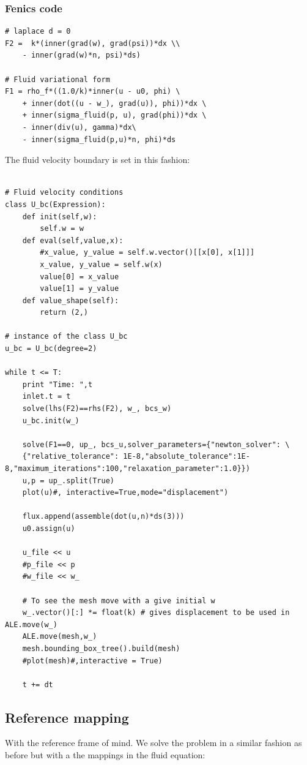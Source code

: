 \subsubsection{Fenics code}
\begin{lstlisting}[frame=single]
# laplace d = 0
F2 =  k*(inner(grad(w), grad(psi))*dx \\
    - inner(grad(w)*n, psi)*ds)

# Fluid variational form
F1 = rho_f*((1.0/k)*inner(u - u0, phi) \
    + inner(dot((u - w_), grad(u)), phi))*dx \
    + inner(sigma_fluid(p, u), grad(phi))*dx \
    - inner(div(u), gamma)*dx\
    - inner(sigma_fluid(p,u)*n, phi)*ds
\end{lstlisting}
The fluid velocity boundary is set in this fashion:
\begin{lstlisting}[frame=single]

# Fluid velocity conditions
class U_bc(Expression):
    def init(self,w):
        self.w = w
    def eval(self,value,x):
        #x_value, y_value = self.w.vector()[[x[0], x[1]]]
        x_value, y_value = self.w(x)
        value[0] = x_value
        value[1] = y_value
    def value_shape(self):
        return (2,)
      
# instance of the class U_bc      
u_bc = U_bc(degree=2)

while t <= T:
    print "Time: ",t
    inlet.t = t
    solve(lhs(F2)==rhs(F2), w_, bcs_w)
    u_bc.init(w_)

    solve(F1==0, up_, bcs_u,solver_parameters={"newton_solver": \
    {"relative_tolerance": 1E-8,"absolute_tolerance":1E-8,"maximum_iterations":100,"relaxation_parameter":1.0}})
    u,p = up_.split(True)
    plot(u)#, interactive=True,mode="displacement")

    flux.append(assemble(dot(u,n)*ds(3)))
    u0.assign(u)

    u_file << u
    #p_file << p
    #w_file << w_

    # To see the mesh move with a give initial w
    w_.vector()[:] *= float(k) # gives displacement to be used in ALE.move(w_)
    ALE.move(mesh,w_)
    mesh.bounding_box_tree().build(mesh)
    #plot(mesh)#,interactive = True)

    t += dt
\end{lstlisting}

\subsection*{Reference mapping}
With the reference frame of mind. We solve the problem in a similar fashion as before but with a the mappings in the fluid equation:

